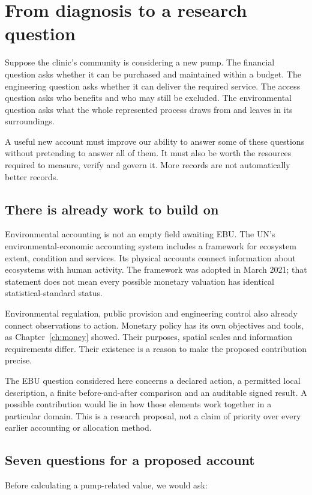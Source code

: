 \chapter{From diagnosis to a research question}\label{ch:research}

Suppose the clinic's community is considering a new pump. The financial question asks whether it can be purchased and maintained within a budget. The engineering question asks whether it can deliver the required service. The access question asks who benefits and who may still be excluded. The environmental question asks what the whole represented process draws from and leaves in its surroundings.

A useful new account must improve our ability to answer some of these questions without pretending to answer all of them. It must also be worth the resources required to measure, verify and govern it. More records are not automatically better records.

\section{There is already work to build on}
Environmental accounting is not an empty field awaiting EBU. The UN's environmental-economic accounting system includes a framework for ecosystem extent, condition and services. Its physical accounts connect information about ecosystems with human activity. The framework was adopted in March 2021; that statement does not mean every possible monetary valuation has identical statistical-standard status.\cite{seea}

Environmental regulation, public provision and engineering control also already connect observations to action. Monetary policy has its own objectives and tools, as Chapter~\ref{ch:money} showed. Their purposes, spatial scales and information requirements differ. Their existence is a reason to make the proposed contribution precise.

The EBU question considered here concerns a declared action, a permitted local description, a finite before-and-after comparison and an auditable signed result. A possible contribution would lie in how those elements work together in a particular domain. This is a research proposal, not a claim of priority over every earlier accounting or allocation method.

\clearpage
\section{Seven questions for a proposed account}
Before calculating a pump-related value, we would ask:

